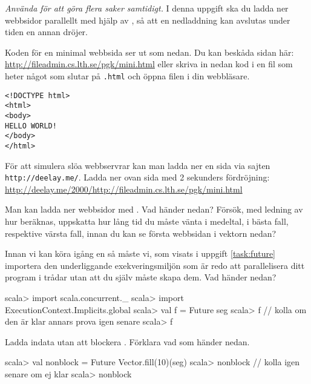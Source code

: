 \Task \emph{Använda  för att göra flera saker samtidigt.}
I denna uppgift ska du ladda ner webbsidor parallellt med hjälp av , så att en nedladdning kan avslutas under tiden en annan dröjer.  

\Subtask Koden för en minimal webbsida ser ut som nedan. Du kan beskåda sidan här: \url{http://fileadmin.cs.lth.se/pgk/mini.html} eller skriva in nedan kod i en fil som heter något som slutar på \texttt{.html} och öppna filen i din webbläsare.

\begin{verbatim}
<!DOCTYPE html>
<html>
<body>
HELLO WORLD!
</body>
</html>
\end{verbatim}

\Subtask För att simulera slöa webbservrar kan man ladda ner en sida via sajten \texttt{http://deelay.me/}. Ladda ner ovan sida med 2 sekunders fördröjning:\\
\url{http://deelay.me/2000/http://fileadmin.cs.lth.se/pgk/mini.html}

\Subtask Man kan ladda ner webbsidor med . Vad händer nedan? Försök, med ledning av hur  beräknas, uppskatta hur lång tid du måste vänta i medeltal, i bästa fall, respektive värsta fall, innan du kan se första webbsidan i vektorn  nedan?


\Subtask Innan vi kan köra igång en  så måste vi, som visats i uppgift \ref{task:future} importera den underliggande exekveringsmiljön som är redo att parallelisera ditt program i trådar utan att du själv måste skapa dem. Vad händer nedan?
\begin{REPL}
scala> import scala.concurrent._ 
scala> import ExecutionContext.Implicits.global
scala> val f = Future{ seg }
scala> f   // kolla om den är klar annars prova igen senare
scala> f
\end{REPL}

\Subtask Ladda indata utan att blockera . Förklara vad som händer nedan.
\begin{REPL}
scala> val nonblock = Future{ Vector.fill(10)(seg) }
scala> nonblock   // kolla igen senare om ej klar
scala> nonblock  
\end{REPL}

